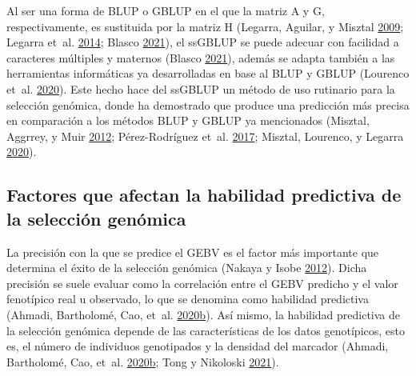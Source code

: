 \documentclass[11pt,spanish,a4paper,oneside,]{book} %
\begin{document}
Al ser una forma de BLUP o GBLUP en el que la matriz A y G, respectivamente, es sustituida por la matriz H (Legarra, Aguilar, y Misztal \protect\hyperlink{ref-cite:17}{2009}; Legarra et~al. \protect\hyperlink{ref-cite:15}{2014}; Blasco \protect\hyperlink{ref-cite:21}{2021}), el ssGBLUP se puede adecuar con facilidad a caracteres múltiples y maternos (Blasco \protect\hyperlink{ref-cite:21}{2021}), además se adapta también a las herramientas informáticas ya desarrolladas en base al BLUP y GBLUP (Lourenco et~al. \protect\hyperlink{ref-cite:22}{2020}). Este hecho hace del ssGBLUP un método de uso rutinario para la selección genómica, donde ha demostrado que produce una predicción más precisa en comparación a los métodos BLUP y GBLUP ya mencionados (Misztal, Aggrrey, y Muir \protect\hyperlink{ref-cite:14}{2012}; Pérez-Rodríguez et~al. \protect\hyperlink{ref-cite:19}{2017}; Misztal, Lourenco, y Legarra \protect\hyperlink{ref-cite:18}{2020}).

\hypertarget{factores-que-afectan-la-habilidad-predictiva-de-la-selecciuxf3n-genuxf3mica}{%
\subsection{Factores que afectan la habilidad predictiva de la selección genómica}\label{factores-que-afectan-la-habilidad-predictiva-de-la-selecciuxf3n-genuxf3mica}}

La precisión con la que se predice el GEBV es el factor más importante que determina el éxito de la selección genómica (Nakaya y Isobe \protect\hyperlink{ref-cite:6}{2012}). Dicha precisión se suele evaluar como la correlación entre el GEBV predicho y el valor fenotípico real u observado, lo que se denomina como habilidad predictiva (Ahmadi, Bartholomé, Cao, et~al. \protect\hyperlink{ref-cite:45}{2020}\protect\hyperlink{ref-cite:45}{b}). Así mismo, la habilidad predictiva de la selección genómica depende de las características de los datos genotípicos, esto es, el número de individuos genotipados y la densidad del marcador (Ahmadi, Bartholomé, Cao, et~al. \protect\hyperlink{ref-cite:45}{2020}\protect\hyperlink{ref-cite:45}{b}; Tong y Nikoloski \protect\hyperlink{ref-cite:7}{2021}).
\end{document}
